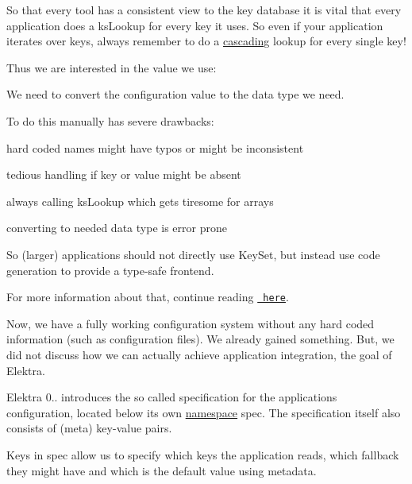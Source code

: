So that every tool has a consistent view to the key database it is vital that every application does a {\ttfamily ks\+Lookup} for every key it uses. So even if your application iterates over keys, always remember to do a \mbox{\hyperlink{doc_tutorials_cascading_md}{cascading}} lookup for every single key!

Thus we are interested in the value we use\+:


\begin{DoxyCode}{0}
\end{DoxyCode}


We need to convert the configuration value to the data type we need.

To do this manually has severe drawbacks\+:


\begin{DoxyItemize}
\item hard coded names might have typos or might be inconsistent
\item tedious handling if key or value might be absent
\item always calling {\ttfamily ks\+Lookup} which gets tiresome for arrays
\item converting to needed data type is error prone
\end{DoxyItemize}

So (larger) applications should not directly use {\ttfamily Key\+Set}, but instead use code generation to provide a type-\/safe frontend.

For more information about that, continue reading \href{https://master.libelektra.org/src/tools/pythongen}{\texttt{ here}}.

Now, we have a fully working configuration system without any hard coded information (such as configuration files). We already gained something. But, we did not discuss how we can actually achieve application integration, the goal of Elektra.

Elektra 0.. introduces the so called specification for the application\textquotesingle{}s configuration, located below its own \mbox{\hyperlink{doc_help_elektra-namespaces_md}{namespace}} {\ttfamily spec}. The specification itself also consists of (meta) key-\/value pairs.

Keys in {\ttfamily spec} allow us to specify which keys the application reads, which fallback they might have and which is the default value using metadata.

